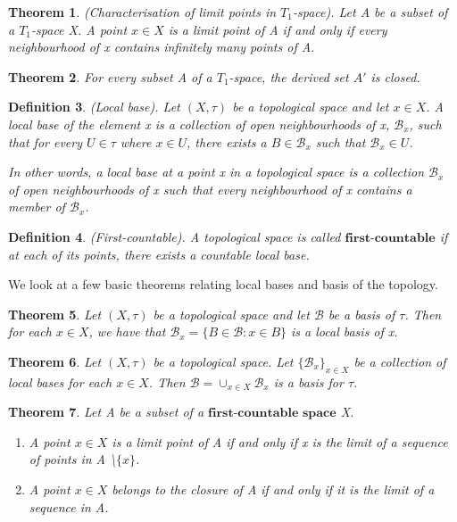 \documentclass[twoside]{article}
\newcounter{lecnum}
\newtheorem{theorem}{Theorem}[lecnum]
\newtheorem{definition}[theorem]{Definition}
\begin{document}
\begin{theorem}(Characterisation of limit points in $T_1$-space). Let A be a subset of a $T_1$-space X. A point $x \in X$ is a limit point of A if and only if every neighbourhood of x contains infinitely many points of A.
\end{theorem}

\begin{theorem}For every subset A of a $T_1$-space, the derived set $A'$ is closed.
\end{theorem}

\begin{definition}(Local base). Let $(X, \tau)$ be a topological space and let $x \in X$. A local base of the element x is a collection of open neighbourhoods of x, $\mathcal{B}_x$, such that for every $U \in \tau$ where $x \in U$, there exists a $B \in \mathcal{B}_x$ such that $\mathcal{B}_x \in U$.

In other words, a local base at a point x in a topological space is a collection $\mathcal{B}_x$ of open neighbourhoods of x such that every neighbourhood of x contains a member of $\mathcal{B}_x$.
\end{definition}

\begin{definition}(First-countable).
A topological space is called $\textbf{first-countable}$ if at each of its points, there exists a countable local base.
\end{definition}

We look at a few basic theorems relating local bases and basis of the topology.
\begin{theorem}Let $(X, \tau)$ be a topological space and let $\mathcal{B}$ be a basis of $\tau$. Then for each $x \in X$, we have that $\mathcal{B}_x = \{B \in \mathcal{B}: x \in B \}$ is a local basis of x.
\end{theorem}

\begin{theorem}Let $(X, \tau)$ be a topological space. Let $\{\mathcal{B}_x\}_{x \in X}$ be a collection of local bases for each $x \in X$. Then $\mathcal{B} = \cup_{x \in X}\mathcal{B}_x$ is a basis for $\tau$.
\end{theorem}


\begin{theorem}Let A be a subset of a $\textbf{first-countable space}$ X.
\begin{enumerate}
\item A point $x \in X$ is a limit point of A if and only if x is the limit of a sequence of points in A \textbackslash $\{x\}$.
\item A point $x \in X$ belongs to the closure of A if and only if it is the limit of a sequence in A.
\end{enumerate}
\end{theorem}
\end{document}
